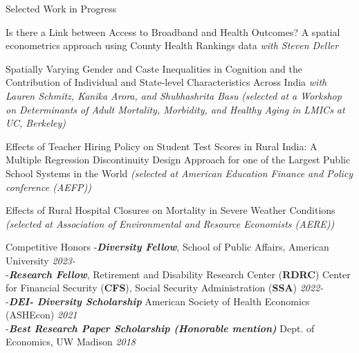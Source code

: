 \documentclass{resume} %
\begin{document}
\begin{rSection}{Selected Work in Progress}

\item Is there a Link between Access to Broadband and Health Outcomes? A spatial econometrics approach using County Health Rankings data \textit{with Steven Deller}

\item Spatially Varying Gender and Caste Inequalities in Cognition and the Contribution of Individual and State-level Characteristics Across India \textit{with Lauren Schmitz, Kanika Arora, and Shubhashrita Basu} \textit{\scriptsize{(selected at a Workshop on Determinants of Adult Mortality, Morbidity, and Healthy Aging in LMICs at UC, Berkeley)}}

\item Effects of Teacher Hiring Policy on Student Test Scores in Rural India: A Multiple Regression Discontinuity Design Approach for one of the Largest Public School Systems in the World \textit{\scriptsize{(selected at American Education Finance and Policy conference (AEFP))}}


\item Effects of Rural Hospital Closures on Mortality in Severe Weather Conditions \textit{\scriptsize{(selected at Association of Environmental and Resource Economists (AERE))}}




\end{rSection}




\begin{rSection}{Competitive Honors}
-\textbf{\textit{Diversity Fellow}}, School of Public Affairs, American University \hfill \textit{2023-} \\
-\textbf{\textit{Research Fellow}}, Retirement and Disability Research Center (\textbf{RDRC}) Center for Financial Security (\textbf{CFS}), Social Security Administration (\textbf{SSA})  \hfill \textit{2022-} \\
-\textbf{\textit{DEI- Diversity Scholarship}} American Society of Health Economics (ASHEcon) \hfill \textit{2021} \\
-\textbf{\textit{Best Research Paper Scholarship (Honorable mention)}} Dept. of Economics, UW Madison \hfill \textit{2018}
\end{rSection}
\end{document}

